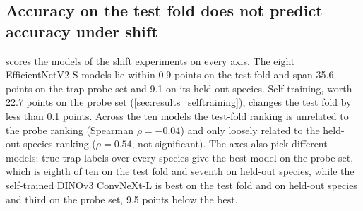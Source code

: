 \subsection{Accuracy on the test fold does not predict accuracy under shift}\label{sec:results_axes}
 scores the models of the shift experiments on every axis.
The eight EfficientNetV2-S models lie within 0.9 points on the test fold and span 35.6 points on the trap probe set and 9.1 on its held-out species.
Self-training, worth 22.7 points on the probe set (\cref{sec:results_selftraining}), changes the test fold by less than 0.1 points.
Across the ten models the test-fold ranking is unrelated to the probe ranking (Spearman $\rho = -0.04$) and only loosely related to the held-out-species ranking ($\rho = 0.54$, not significant).
The axes also pick different models: true trap labels over every species give the best model on the probe set, which is eighth of ten on the test fold and seventh on held-out species, while the self-trained DINOv3 ConvNeXt-L is best on the test fold and on held-out species and third on the probe set, 9.5 points below the best.

